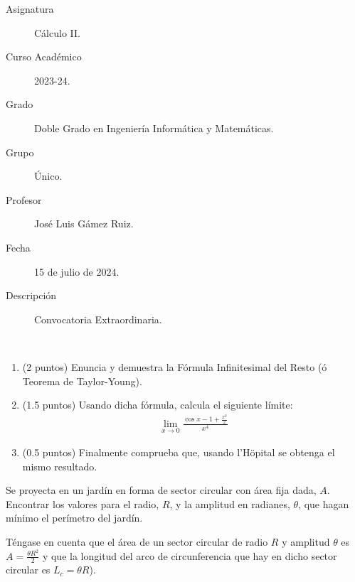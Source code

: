 \documentclass[12pt]{article}
\begin{document}

    
    

    \begin{description}
        \item[Asignatura] Cálculo II.
        \item[Curso Académico] 2023-24.
        \item[Grado] Doble Grado en Ingeniería Informática y Matemáticas.
        \item[Grupo] Único.
        \item[Profesor] José Luis Gámez Ruiz.
        \item[Fecha] 15 de julio de 2024.
        \item[Descripción] Convocatoria Extraordinaria.
    
    \end{description}
    \newpage
    

    \begin{ejercicio}[4 puntos]\ 
        
        \begin{enumerate}
            \item (2 puntos) Enuncia y demuestra la Fórmula Infinitesimal del Resto (ó Teorema de Taylor-Young).

            \item (1.5 puntos) Usando dicha fórmula, calcula el siguiente límite:
            \begin{gather*}
                \lim_{x \to 0} \frac{\cos x - 1 + \frac{x^2}{2}}{x^4}
            \end{gather*}

            \item (0.5 puntos) Finalmente comprueba que, usando l'Höpital se obtenga el mismo resultado.
        \end{enumerate}
        
    \end{ejercicio}
    
    \begin{ejercicio}[2 puntos] Se proyecta en un jardín en forma de sector circular con área fija dada, $A$. Encontrar los valores para el radio, $R$, y la amplitud en radianes, $\theta$, que hagan mínimo el perímetro del jardín.\\
    
    \begin{observacion}
        Téngase en cuenta que el área de un sector circular de radio $R$ y amplitud $\theta$ es $A=\frac{\theta R^2}{2}$ y que la longitud del arco de circunferencia que hay en dicho sector circular es $L_c = \theta R$).
    \end{observacion}
        
    \end{ejercicio}
\end{document}
